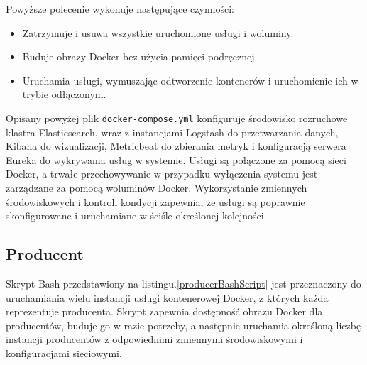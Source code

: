 Powyższe polecenie wykonuje następujące czynności:

\begin{itemize}
    \item Zatrzymuje i usuwa wszystkie uruchomione usługi i woluminy.
    \item Buduje obrazy Docker bez użycia pamięci podręcznej.
    \item Uruchamia usługi, wymuszając odtworzenie kontenerów i uruchomienie ich w trybie odłączonym.
\end{itemize}

Opisany powyżej plik \verb|docker-compose.yml| konfiguruje środowisko rozruchowe klastra Elasticsearch, wraz z instancjami Logstash do przetwarzania danych, Kibana do wizualizacji, Metricbeat do zbierania metryk i konfiguracją serwera Eureka do wykrywania usług w systemie. Usługi są połączone za pomocą sieci Docker, a trwałe przechowywanie w przypadku wyłączenia systemu jest zarządzane za pomocą woluminów Docker. Wykorzystanie zmiennych środowiskowych i kontroli kondycji zapewnia, że usługi są poprawnie skonfigurowane i uruchamiane w ściśle określonej kolejności.

\subsection{Producent}

Skrypt Bash przedstawiony na listingu.\ref{producerBashScript} jest przeznaczony do uruchamiania wielu instancji usługi kontenerowej Docker, z których każda reprezentuje producenta. Skrypt zapewnia dostępność obrazu Docker dla producentów, buduje go w razie potrzeby, a następnie uruchamia określoną liczbę instancji producentów z odpowiednimi zmiennymi środowiskowymi i konfiguracjami sieciowymi.

